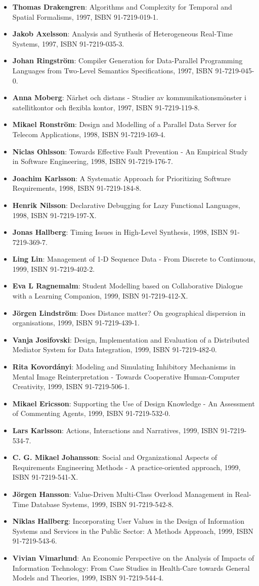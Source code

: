 \documentclass[a4paper,showtrims,twocolumn]{memoir}
\newenvironment{theses}
  {
    \begin{itemize}
      \setlength{\itemsep}{0.2em}
      \setlength{\parskip}{0em}
      \setlength{\parsep}{0em}
  }
  {
    \end{itemize}
  }
\newcommand{\thesis}[5]{\item[No. #1] \textbf{#2}: #3, #4, ISBN #5.}
\begin{document}
\begin{theses}
    \thesis{498}{Thomas Drakengren}{Algorithms and Complexity for Temporal and Spatial Formalisms}{1997}{91-7219-019-1}
    \thesis{502}{Jakob Axelsson}{Analysis and Synthesis of Heterogeneous Real-Time Systems}{1997}{91-7219-035-3}
    \thesis{503}{Johan Ringström}{Compiler Generation for Data-Parallel Programming Languages from Two-Level Semantics Specifications}{1997}{91-7219-045-0}
    \thesis{512}{Anna Moberg}{Närhet och distans - Studier av kommunikationsmönster i satellitkontor och flexibla kontor}{1997}{91-7219-119-8}
    \thesis{520}{Mikael Ronström}{Design and Modelling of a Parallel Data Server for Telecom Applications}{1998}{91-7219-169-4}
    \thesis{522}{Niclas Ohlsson}{Towards Effective Fault Prevention - An Empirical Study in Software Engineering}{1998}{91-7219-176-7}
    \thesis{526}{Joachim Karlsson}{A Systematic Approach for Prioritizing Software Requirements}{1998}{91-7219-184-8}
    \thesis{530}{Henrik Nilsson}{Declarative Debugging for Lazy Functional Languages}{1998}{91-7219-197-X}
    \thesis{555}{Jonas Hallberg}{Timing Issues in High-Level Synthesis}{1998}{91-7219-369-7}
    \thesis{561}{Ling Lin}{Management of 1-D Sequence Data - From Discrete to Continuous}{1999}{91-7219-402-2}
    \thesis{563}{Eva L Ragnemalm}{Student Modelling based on Collaborative Dialogue with a Learning Companion}{1999}{91-7219-412-X}
    \thesis{567}{Jörgen Lindström}{Does Distance matter? On geographical dispersion in organisations}{1999}{91-7219-439-1}
    \thesis{582}{Vanja Josifovski}{Design, Implementation and Evaluation of a Distributed Mediator System for Data Integration}{1999}{91-7219-482-0}
    \thesis{589}{Rita Kovordányi}{Modeling and Simulating Inhibitory Mechanisms in Mental Image Reinterpretation - Towards Cooperative Human-Computer Creativity}{1999}{91-7219-506-1}
    \thesis{592}{Mikael Ericsson}{Supporting the Use of Design Knowledge - An Assessment of Commenting Agents}{1999}{91-7219-532-0}
    \thesis{593}{Lars Karlsson}{Actions, Interactions and Narratives}{1999}{91-7219-534-7}
    \thesis{594}{C. G. Mikael Johansson}{Social and Organizational Aspects of Requirements Engineering Methods - A practice-oriented approach}{1999}{91-7219-541-X}
    \thesis{595}{Jörgen Hansson}{Value-Driven Multi-Class Overload Management in Real-Time Database Systems}{1999}{91-7219-542-8}
    \thesis{596}{Niklas Hallberg}{Incorporating User Values in the Design of Information Systems and Services in the Public Sector: A Methods Approach}{1999}{91-7219-543-6}
    \thesis{597}{Vivian Vimarlund}{An Economic Perspective on the Analysis of Impacts of Information Technology: From Case Studies in Health-Care towards General Models and Theories}{1999}{91-7219-544-4}

\end{theses}
\end{document}
